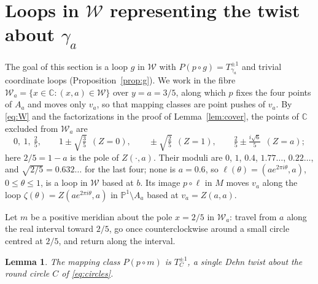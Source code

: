 \documentclass[11pt]{article}
\newcommand{\Pone}{\mathbb P^1}
\newcommand{\C}{\mathbb C}
\newcommand{\W}{\mathcal W}
\newtheorem{lemma}[theorem]{Lemma}
\theoremstyle{remark}
\numberwithin{equation}{section}
\begin{document}
\section{Loops in \texorpdfstring{$\W$}{W} representing the twist about
\texorpdfstring{$\gamma_a$}{gamma\_a}}\label{sec:loops}

The goal of this section is a loop $g$ in $\W$ with
$P(p\circ g)=T_{\gamma_a}^{\pm1}$ and trivial coordinate loops
(Proposition~\ref{prop:g}). We work in the fibre
$\W_a=\{x\in\C:(x,a)\in\W\}$ over $y=a=3/5$, along which $p$ fixes the
four points of $A_a$ and moves only $v_a$, so that mapping classes are
point pushes of $v_a$. By \eqref{eq:W} and the
factorizations in the proof of Lemma~\ref{lem:cover}, the points of $\C$
excluded from $\W_a$ are
\begin{equation}\label{eq:forbidden}
 0,\ 1,\ \tfrac25,\qquad
 1\pm\sqrt{\tfrac35}\ \ (Z=0),\qquad
 \pm\sqrt{\tfrac25}\ \ (Z=1),\qquad
 \tfrac25\pm\tfrac{i\sqrt6}{5}\ \ (Z=a);
\end{equation}
here $2/5=1-a$ is the pole of $Z(\cdot,a)$. 
Their moduli are
$0$, $1$, $0.4$, $1.77\ldots$, $0.22\ldots$, and $\sqrt{2/5}=0.632\ldots$
for the last four; none is $a=0.6$, so
$\ell(\theta)=(ae^{2\pi i\theta},a)$, $0\le\theta\le1$, is a loop in $\W$
based at $b$. Its image $p\circ\ell$ in $M$ moves $v_a$ along the loop
$\zeta(\theta)=Z(ae^{2\pi i\theta},a)$ in $\Pone\setminus A_a$ based at
$v_a=Z(a,a)$.

Let $m$ be a positive meridian about the pole $x=2/5$ in $\W_a$: travel
from $a$ along the real interval toward $2/5$, go once counterclockwise
around a small circle centred at $2/5$, and return along the interval.

\begin{lemma}\label{lem:m}
The mapping class $P(p\circ m)$ is $T_C^{\pm1}$, a single Dehn twist about
the round circle $C$ of \eqref{eq:circles}.
\end{lemma}
\end{document}

